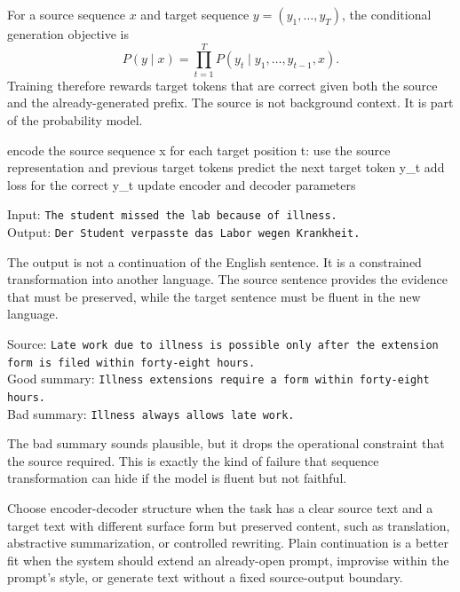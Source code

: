 \begin{mathlens}
For a source sequence \(x\) and target sequence \(y=(y_1,\ldots,y_T)\), the conditional generation objective is
\[
P(y\mid x)=\prod_{t=1}^{T} P(y_t \mid y_1,\ldots,y_{t-1},x).
\]
Training therefore rewards target tokens that are correct given both the source and the already-generated prefix. The source is not background context. It is part of the probability model.
\end{mathlens}

\begin{codeexample}[caption={A minimal encoder-decoder training sketch}]
encode the source sequence x
for each target position t:
    use the source representation and previous target tokens
    predict the next target token y_t
    add loss for the correct y_t
update encoder and decoder parameters
\end{codeexample}

\begin{example}
Input: \texttt{The student missed the lab because of illness.}\\
Output: \texttt{Der Student verpasste das Labor wegen Krankheit.}

The output is not a continuation of the English sentence. It is a constrained transformation into another language. The source sentence provides the evidence that must be preserved, while the target sentence must be fluent in the new language.
\end{example}

\begin{example}
Source: \texttt{Late work due to illness is possible only after the extension form is filed within forty-eight hours.}\\
Good summary: \texttt{Illness extensions require a form within forty-eight hours.}\\
Bad summary: \texttt{Illness always allows late work.}

The bad summary sounds plausible, but it drops the operational constraint that the source required. This is exactly the kind of failure that sequence transformation can hide if the model is fluent but not faithful.
\end{example}

\begin{practicalnote}
Choose encoder-decoder structure when the task has a clear source text and a target text with different surface form but preserved content, such as translation, abstractive summarization, or controlled rewriting. Plain continuation is a better fit when the system should extend an already-open prompt, improvise within the prompt's style, or generate text without a fixed source-output boundary.
\end{practicalnote}

